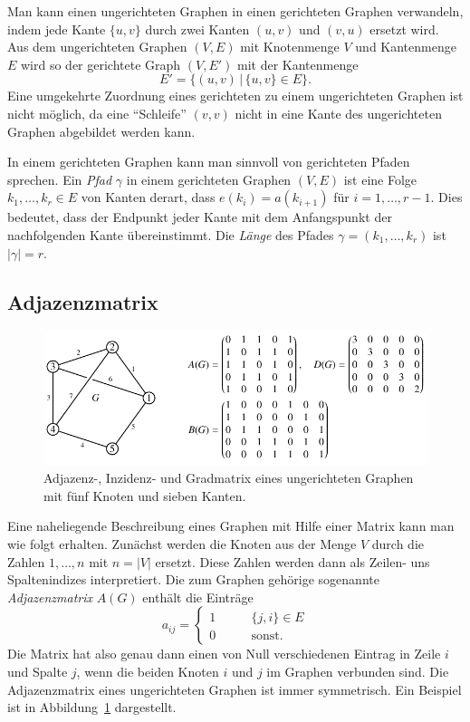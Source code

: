 Man kann einen ungerichteten Graphen in einen gerichteten Graphen
verwandeln, indem jede Kante $\{u,v\}$ durch zwei Kanten 
$(u,v)$ und $(v,u)$ ersetzt wird.
Aus dem ungerichteten Graphen $(V,E)$ mit Knotenmenge $V$ und Kantenmenge
$E$ wird so der gerichtete Graph
$(V,E')$ mit der Kantenmenge
\begin{equation*}
E' 
=
\{
(u,v)
\,|\,
\{u,v\}\in E
\}.
\end{equation*}
Eine umgekehrte Zuordnung eines gerichteten zu einem ungerichteten
Graphen ist nicht möglich, da eine ``Schleife'' $(v,v)$ nicht in eine Kante
des ungerichteten Graphen abgebildet werden kann.

In einem gerichteten Graphen kann man sinnvoll von gerichteten Pfaden
sprechen.
%
Ein {\em Pfad} $\gamma$ in einem gerichteten Graphen $(V,E)$ ist eine Folge
$k_1,\dots,k_r\in E$ von Kanten derart, dass $e(k_i) = a(k_{i+1})$
für $i=1,\dots,r-1$.
Dies bedeutet, dass der Endpunkt jeder Kante mit dem Anfangspunkt der
nachfolgenden Kante übereinstimmt.
Die {\em Länge} des Pfades $\gamma=(k_1,\dots,k_r)$ ist $|\gamma|=r$.

\subsection{Adjazenzmatrix}
\begin{figure}
\centering
\includegraphics{chapters/70-graphen/images/adjazenzu.pdf}
\caption{Adjazenz-, Inzidenz- und Gradmatrix eines ungerichteten
Graphen mit fünf Knoten und sieben Kanten.
\label{buch:graphen:fig:adjazenzu}}
\end{figure}
Eine naheliegende Beschreibung eines Graphen mit Hilfe einer
Matrix kann man wie folgt erhalten.
Zunächst werden die Knoten aus der Menge $V$ durch die Zahlen
$1,\dots,n$ mit $n=|V|$ ersetzt.
Diese Zahlen werden dann als Zeilen- uns Spaltenindizes interpretiert.
Die zum Graphen gehörige sogenannte {\em Adjazenzmatrix} $A(G)$
enthält die Einträge
\begin{equation}
a_{i\!j}
=
\begin{cases}
1&\qquad  \{j,i\} \in E\\
0&\qquad  \text{sonst.}
\end{cases}
\label{buch:graphen:eqn:adjazenzmatrix}
\end{equation}
Die Matrix hat also genau dann einen von Null verschiedenen Eintrag
in Zeile $i$ und Spalte $j$, wenn die beiden Knoten $i$ und $j$
im Graphen verbunden sind.
Die Adjazenzmatrix eines ungerichteten Graphen ist immer symmetrisch.
Ein Beispiel ist in Abbildung~\ref{buch:graphen:fig:adjazenzu}
dargestellt.

